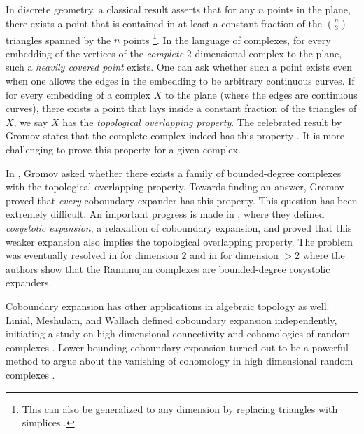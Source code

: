 \documentclass[10pt,a4paper]{article}
\theoremstyle{definition}
\theoremstyle{remark}
\numberwithin{equation}{section}
\begin{document}
In discrete geometry, a classical result asserts that for any $n$ points in the plane, there exists a point that is contained in at least a constant fraction of the $\binom{n}{3}$ triangles spanned by the $n$ points \cite{Barany1982} \footnote{This can also be generalized to any dimension by replacing triangles with simplices \cite{BorosF1984}.}. In the language of complexes, for every embedding of the vertices of the \emph{complete} $2$-dimensional complex to the plane, such a \emph{heavily covered point} exists. One can ask whether such a point exists even when one allows the edges in the embedding to be arbitrary continuous curves. If for every embedding of a complex \(X\) to the plane (where the edges are continuous curves), there exists a point that lays inside a constant fraction of the triangles of \(X\), we say \(X\) has the \emph{topological overlapping property}. The celebrated result by Gromov states that the complete complex indeed has this property \cite{Gromov2010}. It is more challenging to prove this property for a given complex.

In \cite{Gromov2010}, Gromov asked whether there exists a family of bounded-degree complexes with the topological overlapping property. Towards finding an answer, Gromov proved that \emph{every} coboundary expander has this property. This question has been extremely difficult. An important progress is made in \cite{DotterrerKW2018}, where they defined \emph{cosystolic expansion}, a relaxation of coboundary expansion, and proved that this weaker expansion also implies the topological overlapping property. The problem was eventually resolved in \cite{KaufmanKL2016} for dimension $2$ and in \cite{EvraK2016} for dimension $>2$ where the authors show that the \cite{LubotzkySV2005} Ramanujan complexes are bounded-degree cosystolic expanders. 

Coboundary expansion has other applications in algebraic topology as well. Linial, Meshulam, and Wallach defined coboundary expansion independently, initiating a study on high dimensional connectivity and cohomologies of random complexes \cite{LinialM2006,MeshulamW2009}. Lower bounding coboundary expansion turned out to be a powerful method to argue about the vanishing of cohomology in high dimensional random complexes \cite{DotterrerK2012,HoffmanKP2017}.
\end{document}

